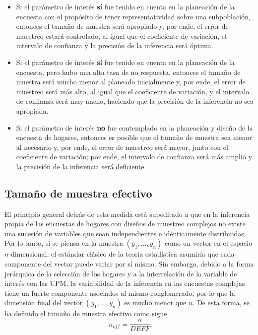 \documentclass[
  12pt,
]{book}
\providecommand{\tightlist}{%
  \setlength{\itemsep}{0pt}\setlength{\parskip}{0pt}}
\begin{document}
\begin{itemize}
\tightlist
\item
  Si el parámetro de interés \textbf{sí} fue tenido en cuenta en la planeación de la encuesta con el propósito de tener representatividad sobre una subpoblación, entonces el tamaño de muestra será apropiado y, por ende, el error de muestreo estará controlado, al igual que el coeficiente de variación, el intervalo de confianza y la precisión de la inferencia será óptima.
\item
  Si el parámetro de interés \textbf{sí} fue tenido en cuenta en la planeación de la encuesta, pero hubo una alta tasa de no respuesta, entonces el tamaño de muestra será mucho menor al planeado inicialmente y, por ende, el error de muestreo será más alto, al igual que el coeficiente de variación, y el intervalo de confianza será muy ancho, haciendo que la precisión de la inferencia no sea apropiada.
\item
  Si el parámetro de interés \textbf{no} fue contemplado en la planeación y diseño de la encuesta de hogares, entonces es posible que el tamaño de muestra sea menor al necesario y, por ende, el error de muestreo será mayor, junto con el coeficiente de variación; por ende, el intervalo de confianza será más amplio y la precisión de la inferencia será deficiente.
\end{itemize}

\hypertarget{tamauxf1o-de-muestra-efectivo}{%
\subsection{Tamaño de muestra efectivo}\label{tamauxf1o-de-muestra-efectivo}}

El principio general detrás de esta medida está supeditado a que en la inferencia propia de las encuestas de hogares con diseños de muestreo complejos no existe una sucesión de variables que sean independientes e idénticamente distribuidas. Por lo tanto, si se piensa en la muestra \((y_1, \ldots, y_n)\) como un vector en el espacio \(n\)-dimensional, el estándar clásico de la teoría estadística asumiría que cada componente del vector puede variar por sí mismo. Sin embargo, debido a la forma jerárquica de la selección de los hogares y a la interrelación de la variable de interés con las UPM, la variabilidad de la inferencia en las encuestas complejas tiene un fuerte componente asociados al mismo conglomerado, por lo que la dimensión final del vector \((y_1, \ldots, y_n)\) es mucho menor que \(n\). De esta forma, se ha definido el tamaño de muestra efectivo \citep[capítulo 6]{United_Nations_2005} como sigue
\[
n_{eff} = \frac{n}{DEFF}
\]
\end{document}
